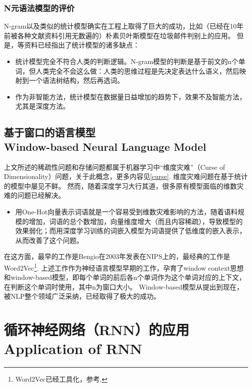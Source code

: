 \subsubsection{N元语法模型的评价}

N-gram以及类似的统计模型确实在工程上取得了巨大的成功，比如（已经在10年前被各种文献资料引用无数遍的）朴素贝叶斯模型在垃圾邮件判别上的应用。
但是，\cite{05-stat-fail}等资料已经指出了统计模型的诸多缺点：
\begin{itemize}
    \item 统计模型完全不符合人类的判断逻辑。N-gram模型的判断是基于前文的n个单词，但人类完全不会这么做：人类的思维过程是先决定表达什么语义，然后映射到一个语法树结构，然后再选词。
    \item 作为非智能方法，统计模型在数据量日益增加的趋势下，效果不及智能方法，尤其是深度方法。
\end{itemize}

\subsection{基于窗口的语言模型 \\ Window-based Neural Language Model}

上文所述的稀疏性问题和存储问题都属于机器学习中“维度灾难”（Curse of Dimensionality）问题，关于此概念，更多内容见\ref{curse}. 维度灾难问题在基于统计的模型中屡见不鲜。
然而，随着深度学习大行其道，很多原有模型面临的维数灾难的问题已经解决。

\begin{itemize}
\item 用One-Hot向量表示词语就是一个容易受到维数灾难影响的方法，随着语料规模的增加，词语的总个数增加，向量维度增大（而且内容稀疏），导致模型的效果弱化；而用深度学习训练的词嵌入模型为词语提供了低维度的嵌入表示，从而改善了这个问题。
\end{itemize}

在这方面，最早的工作是Bengio在2003年发表在NIPS上的\cite{05-bengio03}，最经典的工作是Word2Vec\footnote{Word2Vec已经工具化，参考\cite{05-w2v}.}\cite{05-w2v-model, 05-w2v-opti}.
上述工作作为神经语言模型早期的工作，孕育了window context思想和window-based模型，即每个单词的前后各n个单词作为这个单词对应的上下文，在判断这个单词时使用，其中n为窗口大小。
Window-based模型从提出到现在，被NLP整个领域广泛采纳，已经取得了极大的成功。

\section{循环神经网络（RNN）的应用 \\ Application of RNN}

